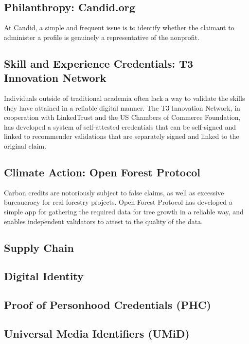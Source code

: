 \documentclass[11pt]{article}
\begin{document}
\subsection{Philanthropy: Candid.org}
At Candid, a simple and frequent issue is to identify whether the claimant to administer a profile is genuinely a representative of the nonprofit.

\subsection{Skill and Experience Credentials: T3 Innovation Network}
Individuals outside of traditional academia often lack a way to validate the skills they have attained in a reliable digital manner.  The T3 Innovation Network, in cooperation with LinkedTrust and the US Chambers of Commerce Foundation, has developed a system of self-attested credentials that can be self-signed and linked to recommender validations that are separately signed and linked to the original claim.

\subsection{Climate Action: Open Forest Protocol}

Carbon credits are notoriously subject to false claims, as well as excessive bureaucracy for real forestry projects.  Open Forest Protocol has developed a simple app for gathering the required data for tree growth in a reliable way, and enables independent validators to attest to the quality of the data.

\subsection{Supply Chain}

\subsection{Digital Identity}

\subsection{Proof of Personhood Credentials (PHC)}

\subsection{Universal Media Identifiers (UMiD)}
\end{document}
